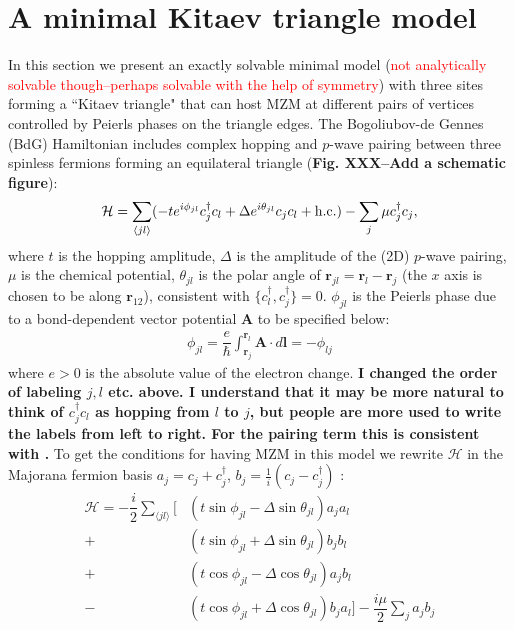 \documentclass[aps,prb,showpacs,amsmath,twocolumn,amssymb,superscriptaddress]{revtex4-2}
\newcommand{\Red}[1]{\textcolor{red}{#1}}
\renewcommand{\vec}[1]{\mathbf{#1}}
\newcommand{\ham}{\mathcal{H}}
\newcommand{\cc}{c^{\dagger}}
\newcommand{\de}{\Delta}
\begin{document}
\section{A minimal Kitaev triangle model}

In this section we present an exactly solvable minimal model (\Red{not analytically solvable though--perhaps solvable with the help of symmetry}) with three sites forming a ``Kitaev triangle" that can host MZM at different pairs of vertices controlled by Peierls phases on the triangle edges. The Bogoliubov-de Gennes (BdG) Hamiltonian includes complex hopping and $p$-wave pairing between three spinless fermions forming an equilateral triangle ({\bf Fig. XXX--Add a schematic figure}):
\begin{equation}
  \ham = \sum_{\langle j l \rangle} (-te^{i\phi_{jl}}\cc_{j} c_l + \de e^{i\theta_{jl}} c_{j} c_l + {\rm h.c.}) - \sum_{j} \mu \cc_j c_j,
\end{equation}
where $t$ is the hopping amplitude, $\de$ is the amplitude of the (2D) $p$-wave pairing, $\mu$ is the chemical potential, $\theta_{jl}$ is the polar angle of $\mathbf r_{jl} = \mathbf r_l - \mathbf r_j$ (the $x$ axis is chosen to be along $\mathbf r_{12}$), consistent with $\{c^\dag_l, c^\dag_j\} = 0$. $\phi_{jl}$ is the Peierls phase due to a bond-dependent vector potential $\mathbf A$ to be specified below: 
\begin{eqnarray}
\phi_{jl} = \dfrac{e}{\hbar} \int_{\mathbf r_j}^{\mathbf r_{l}} \vec{A} \cdot d\vec{l} = -\phi_{lj}
\end{eqnarray}
where $e>0$ is the absolute value of the electron change. {\bf I changed the order of labeling $j,l$ etc. above. I understand that it may be more natural to think of $c_j^\dag c_l$ as hopping from $l$ to $j$, but people are more used to write the labels from left to right. For the pairing term this is consistent with \cite{kitaevUnpairedMajoranaFermions2001}.} To get the conditions for having MZM in this model we rewrite $\mathcal{H}$ in the Majorana fermion basis $a_{j} = c_j + c^\dag_j$, $b_j = \frac{1}{i}(c_j - c^\dag_j)$ \cite{supp}:
\begin{align}\label{eq:H3M}
    \ham =  -\dfrac{i}{2} \sum_{\langle j l \rangle} \Big[&\left(t\sin\phi_{jl}-\de\sin\theta_{jl}\right) a_j a_l \\\nonumber
  +&\left(t\sin\phi_{jl}+\de\sin\theta_{jl}\right) b_j b_l  \\\nonumber
  +&\left(t\cos\phi_{jl} - \de\cos\theta_{jl}\right) a_j b_l  \\\nonumber
  -&\left(t\cos\phi_{jl}+\de\cos\theta_{jl}\right) b_j a_l\Big]  -\dfrac{i\mu}{2} \sum_j  a_j b_j
\end{align}
\end{document}
